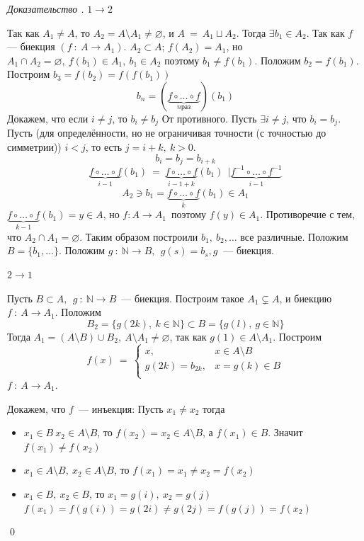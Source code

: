 \documentclass[12pt,oneside]{article}
\theoremstyle{definition}
\newenvironment{ourproof}[1]{\textit{Доказательство #1.}}{\qed}
\begin{document}
\begin{ourproof}{}
$1\longrightarrow 2$

Так как $A_1 \neq A$, то $A_2=A\setminus A_1\neq \varnothing$, и $A\ =\ A_1\sqcup A_2$. Тогда $\exists b_1\in A_2$. Так как $f$ --- биекция $(f\ :\ A\longrightarrow A_1)$. $A_2 \subset A$; $f(A_2)=A_1$, но $A_1\cap A_2=\varnothing,\ f(b_1)\in A_1,\ b_1\in A_2$ поэтому $b_1 \neq f(b_1)$. Положим $b_2=f(b_1)$.
\newline
Построим $b_3=f(b_2)=f(f(b_1))$
$$b_n=(\underbrace{f\circ\dots\circ f}_{n раз})(b_1)$$
\newline
Докажем, что если $i\neq j$, то $b_i\neq b_j$
От противного. Пусть $\exists i\neq j$, что $b_i=b_j$. Пусть (для определённости, но не ограничивая точности (с точностью до симметрии)) $i<j$, то есть $j=i+k,\ k>0$.
$$b_i=b_j=b_{i+k}$$
$$\underbrace{f\circ\dots\circ f}_{i-1}(b_1)\ =\ \underbrace{f\circ\dots\circ f}_{i-1+k}(b_1)\ \ | \underbrace{f^{-1}\circ\dots\circ f^{-1}}_{i-1}$$
$$A_2\ni b_1=\underbrace{f\circ\dots\circ f}_{k}(b_1)\in A_1$$
$\underbrace{f\circ\dots\circ f}_{k-1}(b_1)=y\in A$, но $f: A \longrightarrow A_1$\ поэтому $f(y)\in A_1$. Противоречие с тем, что $A_2\cap A_1 =\varnothing$. Таким образом построили $b_1,\ b_2,\dots$ все различные. Положим $B=\{b_1,\dots\}$. Положим $g\ :\ \mathbb{N} \longrightarrow B,\ \ g(s)=b_s, g\ $ --- биекция.

$2 \longrightarrow 1$\

Пусть $B\subset A,\ \ g\ :\ \mathbb{N} \longrightarrow B$\ --- биекция.
Построим такое $A_1\varsubsetneq A$, и биекцию $f\ :\ A\longrightarrow A_1$. Положим $$B_2=\{g(2k),\ k\in \mathbb{N}\}\subset B=\{g(l),\ g\in \mathbb{N}\}$$ 
Тогда $A_1 = (A\setminus B)\cup B_2,\ A\setminus A_1 \neq \varnothing$, так как $g(1)\in A\setminus A_1$. Построим
$$f(x)\ =\
        \begin{cases}
        x, & x\in A\setminus B \\
        g(2k)=b_{2k},& x=g(k)\in B \\
        \end{cases}$$
$f\ :\ A\longrightarrow A_1$.

Докажем, что $f$\ --- инъекция:
\newline
Пусть $x_1\neq x_2$ тогда
\begin{itemize}
    \item $x_1\in B\ x_2\in A\setminus B$, то $f(x_2)=x_2\in A\setminus B$, а $f(x_1)\in B$. Значит $f(x_1)\neq f(x_2)$\checkmark
    \item $x_1\in A\setminus B,\ x_2\in A\setminus B$, то $f(x_1)=x_1\neq x_2=f(x_2)$\checkmark
    \item $x_1\in B,\ x_2\in B$, то $x_1=g(i),\ x_2=g(j)$
    \newline
    $f(x_1)=f(g(i))=g(2i)\neq g(2j)=f(g(j))=f(x_2)$\checkmark
\end{itemize}


\end{ourproof}
\end{document}
